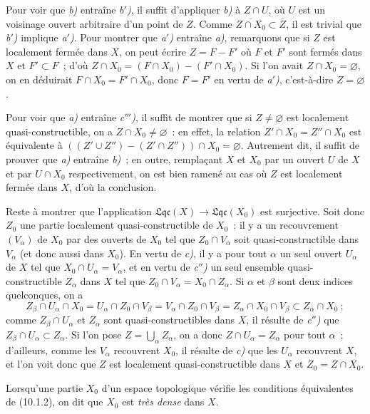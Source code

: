 Pour voir que \emph{b)} entraîne \emph{b$'$)}, il suffit d'appliquer
\emph{b)} à $Z\cap U$, où $U$ est un voisinage ouvert arbitraire d'un point de
$Z$. Comme $\overline{Z\cap X_0}\subset\overline{Z}$, il est trivial
que \emph{b$'$)} implique \emph{a$'$)}. Pour montrer que \emph{a$'$)} entraîne
\emph{a)}, remarquons que si $Z$ est localement fermée dans $X$, on peut
écrire $Z=F-F'$ où $F$ et $F'$ sont fermés dans $X$ et $F'\subset F$~; d'où
$Z\cap X_0=(F\cap X_0)-(F'\cap X_0)$. Si l'on avait
$Z\cap X_0=\varnothing$, on en déduirait $F\cap X_0=F'\cap X_0$, donc
$F=F'$ en vertu de \emph{a$'$)}, c'est-à-dire $Z=\varnothing$.

Pour voir que \emph{a)} entraîne \emph{c$'''$)}, il suffit de montrer que si
$Z\neq\varnothing$ est localement quasi-constructible, on a
$Z\cap X_0\neq\varnothing$~: en effet, la relation
$Z'\cap X_0=Z''\cap X_0$ est équivalente à
$((Z'\cup Z'')-(Z'\cap Z''))\cap X_0=\varnothing$. Autrement dit, il suffit de
prouver que \emph{a)} entraîne \emph{b)}~; en outre, remplaçant $X$ et $X_0$
par un ouvert $U$ de $X$ et par $U\cap X_0$ respectivement, on est bien
ramené au cas où $Z$ est localement fermée dans $X$, d'où la conclusion.

Reste à montrer que l'application
$\mathfrak{Lqc}(X)\to\mathfrak{Lqc}(X_0)$ est surjective. Soit donc $Z_0$ une
partie localement quasi-constructible de $X_0$~: il y a un recouvrement
$(V_\alpha)$ de $X_0$ par des ouverts de $X_0$ tel que $Z_0\cap V_\alpha$ soit
quasi-constructible dans $V_\alpha$ (et
donc aussi dans $X_0$). En vertu de \emph{c)}, il y a pour tout $\alpha$ un
seul ouvert $U_\alpha$ de $X$ tel que $X_0\cap U_\alpha=V_\alpha$, et en
vertu de \emph{c$''$)} un seul ensemble quasi-constructible $Z_\alpha$ dans
$X$ tel que $Z_0\cap V_\alpha=X_0\cap Z_\alpha$. Si $\alpha$ et $\beta$ sont
deux indices quelconques, on a
\[
Z_\beta\cap U_\alpha\cap X_0
=U_\alpha\cap Z_0\cap V_\beta
=V_\alpha\cap Z_0\cap V_\beta
=Z_\alpha\cap X_0\cap V_\beta
\subset Z_\alpha\cap X_0~;
\]
comme $Z_\beta\cap U_\alpha$ et $Z_\alpha$ sont quasi-constructibles dans
$X$, il résulte de \emph{c$''$)} que
$Z_\beta\cap U_\alpha\subset Z_\alpha$. Si l'on pose
$Z=\bigcup_\alpha Z_\alpha$, on a donc $Z\cap U_\alpha=Z_\alpha$ pour tout
$\alpha$~; d'ailleurs, comme les $V_\alpha$ recouvrent $X_0$, il résulte de
\emph{c)} que les $U_\alpha$ recouvrent $X$, et l'on voit donc que $Z$ est
localement quasi-constructible dans $X$ et $Z_0=Z\cap X_0$.

\begin{definition}[10.1.3]
\label{IV.10.1.3-fr}
Lorsqu'une partie $X_0$ d'un espace topologique vérifie les conditions
équivalentes de (10.1.2), on dit que $X_0$ est \emph{très dense} dans $X$.
\end{definition}

